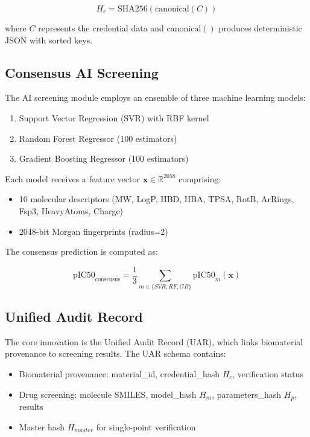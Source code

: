 \begin{equation}
    H_c = \text{SHA256}(\text{canonical}(C))
\end{equation}

\noindent where $C$ represents the credential data and $\text{canonical}()$ produces deterministic JSON with sorted keys.

\subsection{Consensus AI Screening}

The AI screening module employs an ensemble of three machine learning models:

\begin{enumerate}
    \item Support Vector Regression (SVR) with RBF kernel
    \item Random Forest Regressor (100 estimators)
    \item Gradient Boosting Regressor (100 estimators)
\end{enumerate}

Each model receives a feature vector $\mathbf{x} \in \mathbb{R}^{2058}$ comprising:
\begin{itemize}
    \item 10 molecular descriptors (MW, LogP, HBD, HBA, TPSA, RotB, ArRings, Fsp3, HeavyAtoms, Charge)
    \item 2048-bit Morgan fingerprints (radius=2)
\end{itemize}

The consensus prediction is computed as:

\begin{equation}
    \text{pIC50}_{\text{consensus}} = \frac{1}{3}\sum_{m \in \{SVR, RF, GB\}} \text{pIC50}_m(\mathbf{x})
\end{equation}

\subsection{Unified Audit Record}

The core innovation is the Unified Audit Record (UAR), which links biomaterial provenance to screening results. The UAR schema contains:

\begin{itemize}
    \item Biomaterial provenance: material\_id, credential\_hash $H_c$, verification status
    \item Drug screening: molecule SMILES, model\_hash $H_m$, parameters\_hash $H_p$, results
    \item Master hash $H_{master}$ for single-point verification
\end{itemize}

